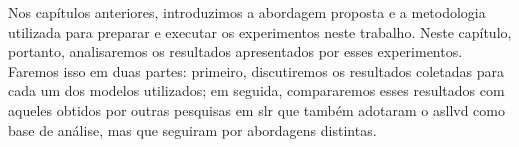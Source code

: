 Nos capítulos anteriores, introduzimos a abordagem proposta e a metodologia utilizada para preparar e executar os experimentos neste trabalho.
Neste capítulo, portanto, analisaremos os resultados apresentados por esses experimentos.
Faremos isso em duas partes: 
primeiro, discutiremos os resultados coletadas para cada um dos modelos utilizados; em seguida, compararemos esses resultados com aqueles obtidos por outras pesquisas em \acrfull{slr} que também adotaram o \acrfull{asllvd} como base de análise, mas que seguiram por abordagens distintas.
